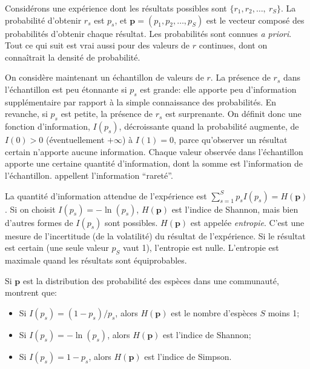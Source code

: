 \documentclass[
  11pt,
  american,
  a4paper,
  extrafontsizes,onecolumn,openright
  ]{memoir}
\providecommand{\tightlist}{%
  \setlength{\itemsep}{0pt}\setlength{\parskip}{0pt}}
\begin{document}
Considérons une expérience dont les résultats possibles sont \(\{r_1, r_2, \dots , \ r_S\}\).
La probabilité d'obtenir \(r_s\) est \(p_s\), et \(\mathbf{p}=(p_1, p_2, \dots, p_S)\) est le vecteur composé des probabilités d'obtenir chaque résultat.
Les probabilités sont connues \emph{a priori}.
Tout ce qui suit est vrai aussi pour des valeurs de \(r\) continues, dont on connaîtrait la densité de probabilité.

On considère maintenant un échantillon de valeurs de \(r\).
La présence de \(r_s\) dans l'échantillon est peu étonnante si \(p_s\) est grande: elle apporte peu d'information supplémentaire par rapport à la simple connaissance des probabilités.
En revanche, si \(p_s\) est petite, la présence de \(r_s\) est surprenante.
On définit donc une fonction d'information, \(I(p_s)\), décroissante quand la probabilité augmente, de \(I(0) > 0\) (éventuellement \(+\infty\)) à \(I(1) = 0\), parce qu'observer un résultat certain n'apporte aucune information.
Chaque valeur observée dans l'échantillon apporte une certaine quantité d'information, dont la somme est l'information de l'échantillon.
\textcite{Patil1982} appellent l'information \enquote{rareté}.

La quantité d'information attendue de l'expérience est \(\sum^S_{s=1}{p_s I(p_s) = H(\mathbf{p})}\).
Si on choisit \(I(p_s) = -\ln(p_s)\), \(H(\mathbf{p})\) est l'indice de Shannon, mais bien d'autres formes de \(I(p_s)\) sont possibles.
\(H(\mathbf{p})\) est appelée \emph{entropie}.
C'est une mesure de l'incertitude (de la volatilité) du résultat de l'expérience.
Si le résultat est certain (une seule valeur \(p_S\) vaut 1), l'entropie est nulle.
L'entropie est maximale quand les résultats sont équiprobables.

Si \(\mathbf{p}\) est la distribution des probabilité des espèces dans une communauté, \textcite{Patil1982} montrent que:

\begin{itemize}
\tightlist
\item
  Si \(I(p_s) = (1 - p_s) / {p_s}\), alors \(H(\mathbf{p})\) est le nombre d'espèces \(S\) moins 1;
\item
  Si \(I(p_s) = -\ln(p_s)\), alors \(H(\mathbf{p})\) est l'indice de Shannon;
\item
  Si \(I(p_s) = 1 - p_s\), alors \(H(\mathbf{p})\) est l'indice de Simpson.
\end{itemize}



\scriptsize
\end{document}
